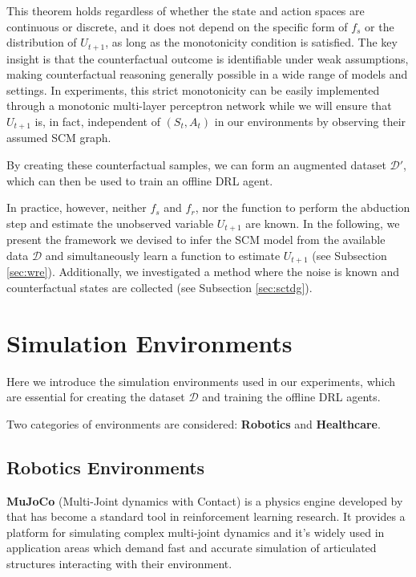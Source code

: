 This theorem holds regardless of whether the state and action spaces are
continuous or discrete, and it does not depend on the specific form of $f_s$
or the distribution of $U_{t+1}$, as long as the monotonicity condition is
satisfied.
The key insight is that the counterfactual outcome is identifiable under
weak assumptions, making counterfactual reasoning generally possible in
a wide range of models and settings.
In experiments, this strict monotonicity can be easily implemented through
a monotonic multi-layer perceptron network
while we will ensure that $U_{t+1}$ is, in fact, independent of $(S_t, A_t)$
in our environments by observing their assumed SCM graph.

By creating these counterfactual samples, we can form an augmented dataset
\( \mathcal{D}' \), which can then be used to train an offline DRL agent.

In practice, however, neither
\( f_s \) and \( f_r \), nor the function to perform
the abduction step and estimate the unobserved variable
\( U_{t+1} \) are known. In the following, we present the framework
we devised to infer the SCM model from the available data \( \mathcal{D} \)
and simultaneously learn a function to estimate
\( U_{t+1} \) (see Subsection \ref{sec:wre}). Additionally, we investigated
a method where the noise is known and counterfactual states are collected
(see Subsection \ref{sec:sctdg}).

\section{Simulation Environments}

Here we introduce the simulation environments used in our experiments,
which are essential for creating the dataset \( \mathcal{D} \) and
training the offline DRL agents.

Two categories of environments are considered: \textbf{Robotics} and
\textbf{Healthcare}.

\subsection{Robotics Environments}

\textbf{MuJoCo} (Multi-Joint dynamics with Contact)
is a physics engine developed by \cite{todorov2012mujoco}
that has become a standard tool in reinforcement learning research.
It provides a platform for simulating complex multi-joint dynamics
and it's widely used in application areas which
demand fast and accurate simulation of articulated
structures interacting with their environment.

